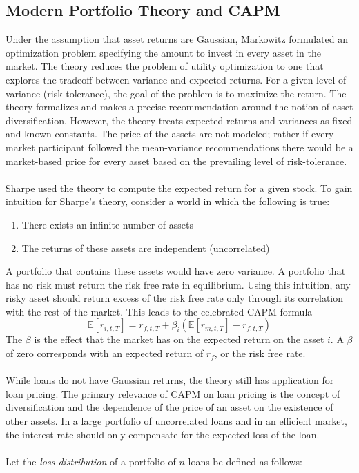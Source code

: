 \documentclass{article}
\theoremstyle{definition}
\begin{document}
\subsection{Modern Portfolio Theory and CAPM}
Under the assumption that asset returns are Gaussian, Markowitz formulated an optimization problem specifying the amount to invest in every asset in the market.  The theory reduces the problem of utility optimization to one that explores the tradeoff between variance and expected returns.  For a given level of variance (risk-tolerance), the goal of the problem is to maximize the return.  The theory formalizes and makes a precise recommendation around the notion of asset diversification.  However, the theory treats expected returns and variances as fixed and known constants.  The price of the assets are not modeled; rather if every market participant followed the mean-variance recommendations there would be a market-based price for every asset based on the prevailing level of risk-tolerance.  
\\
\\
Sharpe used the theory to compute the expected return for a given stock.  To gain intuition for Sharpe's theory, consider a world in which the following is true:
\begin{enumerate}
\item There exists an infinite number of assets
\item The returns of these assets are independent (uncorrelated)
\end{enumerate}

A portfolio that contains these assets would have zero variance.  A portfolio that has no risk must return the risk free rate in equilibrium.  Using this intuition, any risky asset should return excess of the risk free rate only through its correlation with the rest of the market.  This leads to the celebrated CAPM formula 
\[\mathbb{E}[r_{i, t, T}]=r_{f, t, T}+\beta_i \left(\mathbb{E}[r_{m, t, T}]-r_{f, t, T}\right)\]
The \(\beta\) is the effect that the market has on the expected return on the asset \(i\).  A \(\beta\) of zero corresponds with an expected return of \(r_f\), or the risk free rate.
\\
\\
While loans do not have Gaussian returns, the theory still has application for loan pricing.  The primary relevance of CAPM on loan pricing is the concept of diversification and the dependence of the price of an asset on the existence of other assets.  In a large portfolio of uncorrelated loans and in an efficient market, the interest rate should only compensate for the expected loss of the loan.  
\\
\\
Let the \emph{loss distribution} of a portfolio of \(n\) loans be defined as follows:
\end{document}
